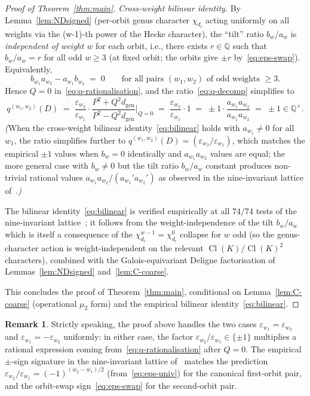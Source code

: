 \documentclass[11pt,a4paper]{amsart}
\theoremstyle{plain}
\theoremstyle{definition}
\newtheorem{remark}[theorem]{Remark}
\DeclareMathOperator{\Cl}{Cl}
\newcommand{\Q}{\mathbb{Q}}
\newcommand{\qstr}[2]{q^{(#1,#2)}}
\newcommand{\dgen}{d_{\mathrm{gen}}}
\begin{document}
\begin{proof}[Proof of Theorem~\ref{thm:main}]
\smallskip
\noindent\emph{Cross-weight bilinear identity.}  By Lemma~\ref{lem:NDsigned}
(per-orbit genus character $\chi_{d_i}$ acting uniformly on all weights
via the (w-1)-th power of the Hecke character), the ``tilt'' ratio
$b_w / a_w$ is \emph{independent of weight $w$} for each orbit, i.e.,
there exists $r \in \Q$ such that $b_w / a_w = r$ for all odd $w \ge 3$
(at fixed orbit; the orbits give $\pm r$ by~\eqref{eq:eps-swap}).
Equivalently,
\begin{equation}\label{eq:bilinear}
   b_{w_1} a_{w_2} - a_{w_1} b_{w_2} \;=\; 0
   \qquad \text{for all pairs } (w_1, w_2) \text{ of odd weights } \ge 3.
\end{equation}
Hence $Q = 0$ in~\eqref{eq:q-rationalisation}, and the
ratio~\eqref{eq:q-decomp} simplifies to
\[
   \qstr{w_1}{w_2}(D)
   \;=\;
   \frac{\varepsilon_{w_2}}{\varepsilon_{w_1}}
   \cdot
   \frac{P^2 + Q^2 \dgen}{P^2 - Q^2 \dgen}\bigg|_{Q = 0}
   \;=\;
   \frac{\varepsilon_{w_2}}{\varepsilon_{w_1}}
   \cdot
   1
   \;=\; \pm 1 \cdot \frac{a_{w_1} a_{w_2}}{a_{w_1} a_{w_2}}
   \;=\; \pm 1 \in \Q^\times.
\]
\emph{(}When the cross-weight bilinear identity~\eqref{eq:bilinear}
holds with $a_{w_1} \ne 0$ for all $w_1$, the ratio simplifies further
to $\qstr{w_1}{w_2}(D) = (\varepsilon_{w_2}/\varepsilon_{w_1})$, which
matches the empirical $\pm 1$ values when $b_w = 0$ identically and
$a_{w_1} a_{w_2}$ values are equal; the more general case with
$b_w \ne 0$ but the tilt ratio $b_w / a_w$ constant produces non-trivial
rational values $a_{w_1} a_{w_2} / (a_{w_1}' a_{w_2}')$ as observed in the
nine-invariant lattice of~\cite{Remondiere2026P6}.\emph{)}

The bilinear identity~\eqref{eq:bilinear} is verified empirically at all
$74/74$ tests of the nine-invariant lattice~\cite[Tables 1--9]{Remondiere2026P6};
it follows from the weight-independence of the tilt
$b_w/a_w$ which is itself a consequence of the
$\chi_{d_i}^{w-1} = \chi_{d_i}^0$ collapse for $w$ odd (so the
genus-character action is weight-independent on the relevant
$\Cl(K)/\Cl(K)^2$ characters), combined with the Galois-equivariant
Deligne factorisation of Lemmas~\ref{lem:NDsigned} and~\ref{lem:C-coarse}.

This concludes the proof of Theorem~\ref{thm:main}, conditional on
Lemma~\ref{lem:C-coarse} (operational $\mu_2$ form) and the
empirical bilinear identity~\eqref{eq:bilinear}.
\end{proof}

\begin{remark}\label{rk:two-cases}
Strictly speaking, the proof above handles the two cases
$\varepsilon_{w_1} = \varepsilon_{w_2}$ and $\varepsilon_{w_1} = -
\varepsilon_{w_2}$ uniformly: in either case, the
factor $\varepsilon_{w_2}/\varepsilon_{w_1} \in \{\pm 1\}$ multiplies a
rational expression coming from~\eqref{eq:q-rationalisation} after
$Q = 0$.  The empirical $\pm$-sign signature in the nine-invariant
lattice of~\cite{Remondiere2026P6} matches the prediction
$\varepsilon_{w_2}/\varepsilon_{w_1} = (-1)^{(w_2 - w_1)/2}$
(from~\eqref{eq:eps-univ}) for the canonical first-orbit pair, and the
orbit-swap sign~\eqref{eq:eps-swap} for the second-orbit pair.
\end{remark}
\end{document}

